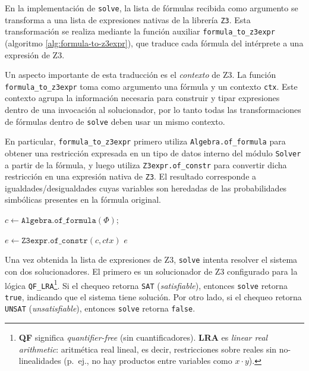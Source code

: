 En la implementación de \verb|solve|, la lista de fórmulas recibida
como argumento se transforma a una lista de expresiones nativas de la
librería \verb|Z3|. Esta transformación se realiza mediante la función
auxiliar \verb|formula_to_z3expr| (algoritmo \ref{alg:formula-to-z3expr}), que traduce cada fórmula del
intérprete a una expresión de Z3.

Un aspecto importante de esta traducción es el \emph{contexto} de Z3.
La función \verb|formula_to_z3expr| toma como argumento una fórmula y un
contexto \verb|ctx|. Este contexto agrupa la información necesaria para
construir y tipar expresiones dentro de una invocación al solucionador,
por lo tanto todas las transformaciones de fórmulas dentro de
\verb|solve| deben usar un mismo contexto.

En particular, \verb|formula_to_z3expr| primero utiliza
\verb|Algebra.of_formula| para obtener una restricción expresada en un tipo de datos interno del módulo \verb|Solver| a partir
de la fórmula, y luego utiliza \verb|Z3expr.of_constr| para convertir
dicha restricción en una expresión nativa de \verb|Z3|. El resultado
corresponde a igualdades/desigualdades cuyas variables son heredadas de
las probabilidades simbólicas presentes en la fórmula original.



\begin{algorithm}[H]
\caption{\texttt{formula\_to\_z3expr}}
\label{alg:formula-to-z3expr}

$c \leftarrow \texttt{Algebra.of\_formula}(\Phi)$;

$e \leftarrow \texttt{Z3expr.of\_constr}(c,ctx)$ 
\Return $e$\;
\end{algorithm}


Una vez obtenida la lista de expresiones de Z3, \verb|solve| intenta
resolver el sistema con dos solucionadores. El primero es un
solucionador de Z3 configurado para la lógica
\texttt{QF\_LRA}\footnote{\textbf{QF} significa \emph{quantifier-free}
  (sin cuantificadores). \textbf{LRA} es \emph{linear real
    arithmetic}: aritmética real lineal, es decir, restricciones sobre
  reales sin no-linealidades (p.\ ej., no hay productos entre
  variables como $x\cdot y$).}. Si el chequeo retorna \verb|SAT|
(\emph{satisfiable}), entonces \verb|solve| retorna \verb|true|,
indicando que el sistema tiene solución. Por otro lado, si el chequeo
retorna \verb|UNSAT| (\emph{unsatisfiable}), entonces \verb|solve|
retorna \verb|false|.

